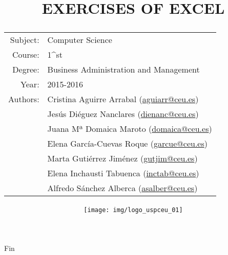 \documentclass[a4paper,titlepage]{article}
\begin{document}
\sloppy

\title{\vskip 2cm
\Huge \textbf{\textsf{\quad \textcolor{blueceu}{EXERCISES OF EXCEL}\quad}}\\
   \vskip 1cm
\Large \sffamily
\begin{tabular}{rl}
\textcolor{blueceu}{Subject:} & Computer Science\\
\textcolor{blueceu}{Course:} & 1^{st}\\
\textcolor{blueceu}{Degree:} &  Business Administration and Management\\
\textcolor{blueceu}{Year:} & 2015-2016\\
\textcolor{blueceu}{Authors:} & Cristina Aguirre Arrabal (\url{aguiarr@ceu.es})\\
& Jesús Diéguez Nanclares (\url{dienanc@ceu.es})\\
& Juana Mª Domaica Maroto (\url{domaica@ceu.es})\\
& Elena García-Cuevas Roque (\url{garcue@ceu.es})\\
& Marta Gutiérrez Jiménez (\url{gutjim@ceu.es})\\
& Elena Inchausti Tabuenca  (\url{inctab@ceu.es})\\
& Alfredo Sánchez Alberca (\url{asalber@ceu.es})
\end{tabular}
}

\author{}
\date{\texttt{[image: img/logo\_uspceu\_01]}}

\maketitle
\newpage
\tableofcontents
\newpage





\begin{center}
\end{center}

\newpage

\begin{center}
\end{center}

Fin
\end{document}
